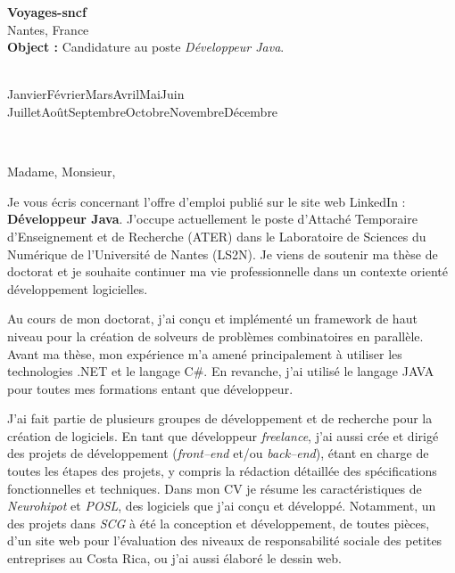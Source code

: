 \documentclass[11pt,a4paper]{letter} %
\def\today{\number\day\space\ifcase\month\or
  Janvier\or Février\or Mars\or Avril\or Mai\or Juin\or
  Juillet\or Août\or Septembre\or Octobre\or Novembre\or Décembre\fi
  \space\number\year}
\def\opening#1{\thispagestyle{empty}
{\centering\fromaddress \vspace{0.6in} \\ %
\hspace{6cm}\today\hspace*{\fill}\par} %
{\raggedright \toname \\ \toaddress \par} %
\vspace{0.4in} %
\noindent #1 %
}
\newcommand{\poste}{Développeur Java}
\begin{document}

\begin{letter}
{{\bf Voyages-sncf}\\Nantes, France\\
\vspace{0.2in}
\textbf{Object :} Candidature au poste \textit{\poste}.
}


\opening{Madame, Monsieur,}

Je vous écris concernant l'offre d'emploi publié sur le site web LinkedIn : 
\textbf{\poste}. 
J'occupe actuellement le poste d'Attaché Temporaire d'Enseignement et de Recherche (ATER) dans le Laboratoire de Sciences du Numérique de l'Université de Nantes (LS2N). Je viens de soutenir ma thèse de doctorat et je souhaite continuer ma vie professionnelle dans un contexte orienté développement logicielles.

Au cours de mon doctorat, j'ai con\c cu et implémenté un framework de haut niveau pour la création de solveurs de problèmes combinatoires en parallèle. %
Avant ma thèse, mon expérience m'a amené principalement à utiliser les technologies .NET et le langage C\#. En revanche, j'ai utilisé le langage JAVA pour toutes mes formations entant que développeur.

J'ai fait partie de plusieurs groupes de développement et de recherche pour la création de logiciels. En tant que développeur \textit{freelance}, j'ai aussi crée et dirigé des projets de développement (\textit{front--end} et/ou \textit{back--end}), étant en charge de toutes les étapes des projets, y compris la rédaction détaillée des spécifications fonctionnelles et techniques. Dans mon CV je résume les caractéristiques de \textit{Neurohipot} et \textit{POSL}, des logiciels que j'ai conçu et développé. Notamment, un des projets dans \textit{SCG} à été la conception et développement, de toutes pièces, d'un site web pour l'évaluation des niveaux de responsabilité sociale des petites entreprises au Costa Rica, ou j'ai aussi élaboré le dessin web.


\end{letter}
\end{document}
